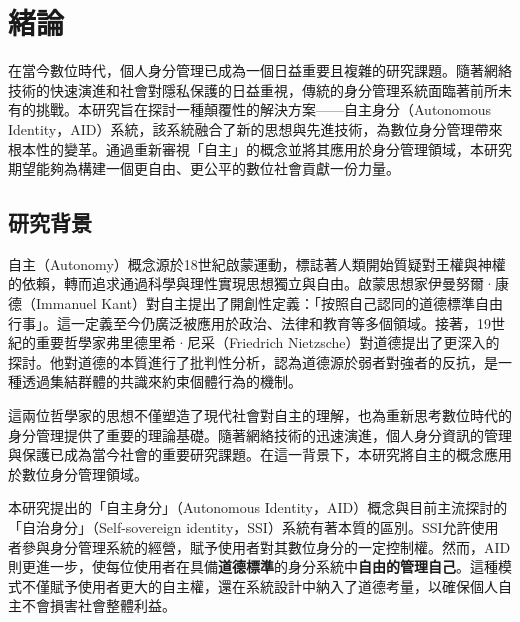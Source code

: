 
\chapter{緒論}
在當今數位時代，個人身分管理已成為一個日益重要且複雜的研究課題。隨著網絡技術的快速演進和社會對隱私保護的日益重視，傳統的身分管理系統面臨著前所未有的挑戰。本研究旨在探討一種顛覆性的解決方案——自主身分（Autonomous Identity，AID）系統，該系統融合了新的思想與先進技術，為數位身分管理帶來根本性的變革。通過重新審視「自主」的概念並將其應用於身分管理領域，本研究期望能夠為構建一個更自由、更公平的數位社會貢獻一份力量。
\section{研究背景}
自主（Autonomy）概念源於18世紀啟蒙運動，標誌著人類開始質疑對王權與神權的依賴，轉而追求通過科學與理性實現思想獨立與自由。啟蒙思想家伊曼努爾·康德（Immanuel Kant）對自主提出了開創性定義：「按照自己認同的道德標準自由行事」。這一定義至今仍廣泛被應用於政治、法律和教育等多個領域。接著，19世紀的重要哲學家弗里德里希·尼采（Friedrich Nietzsche）對道德提出了更深入的探討。他對道德的本質進行了批判性分析，認為道德源於弱者對強者的反抗，是一種透過集結群體的共識來約束個體行為的機制。

這兩位哲學家的思想不僅塑造了現代社會對自主的理解，也為重新思考數位時代的身分管理提供了重要的理論基礎。隨著網絡技術的迅速演進，個人身分資訊的管理與保護已成為當今社會的重要研究課題。在這一背景下，本研究將自主的概念應用於數位身分管理領域。

本研究提出的「自主身分」（Autonomous Identity，AID）概念與目前主流探討的「自治身分」（Self-sovereign identity，SSI）系統有著本質的區別。SSI允許使用者參與身分管理系統的經營，賦予使用者對其數位身分的一定控制權。然而，AID則更進一步，使每位使用者在具備\textbf{道德標準}的身分系統中\textbf{自由的管理自己}。這種模式不僅賦予使用者更大的自主權，還在系統設計中納入了道德考量，以確保個人自主不會損害社會整體利益。
